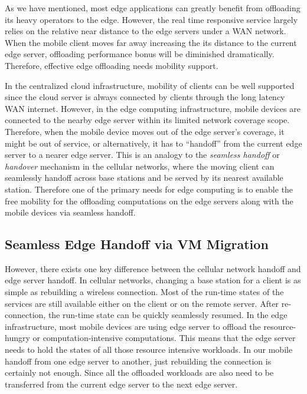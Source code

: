 As we have mentioned, most edge applications can greatly benefit from offloading its heavy operators to the edge. However, the real time responsive service largely relies on the relative near distance to the edge servers under a WAN network. When the mobile client moves far away increasing the its distance to the current edge server, offloading performance bonus will be diminished dramatically.
Therefore, effective edge offloading needs mobility support.

In the centralized cloud infrastructure, mobility of clients can be well supported since the cloud server is always connected by clients through the long latency WAN internet. However, in the edge computing infrastructure, mobile devices are connected to the nearby edge server within its limited network coverage scope. Therefore, when the mobile device moves out of the edge server's coverage, it might be out of service, or alternatively, it has to ``handoff'' from the current edge server to a nearer edge server. 
This is an analogy to the \textit{seamless handoff} or \textit{handover}  mechanism in the cellular networks, where the moving client can seamlessly handoff across base stations and be served by its nearest available station. 
%
Therefore one of the primary needs for edge computing is to enable the free mobility for the offloading computations on the edge servers along with the mobile devices via seamless handoff.


\subsection{Seamless Edge Handoff via VM Migration}

However, there exists one key difference between the cellular network handoff and edge server handoff.
%
In cellular networks, changing a base station for a client is as simple as rebuilding a wireless connection. Most of the run-time states of the services are still available either on the client or on the remote server. After re-connection, the run-time state can be quickly seamlessly resumed. 
%
In the edge infrastructure, most mobile devices are using edge server to offload the resource-hungry or computation-intensive computations. This means that the edge server needs to hold the states of all those resource intensive workloads. 
In our mobile handoff from one edge server to another, just rebuilding the connection is certainly not enough. Since all the offloaded workloads are also need to be transferred from the current edge server to the next edge server.  

